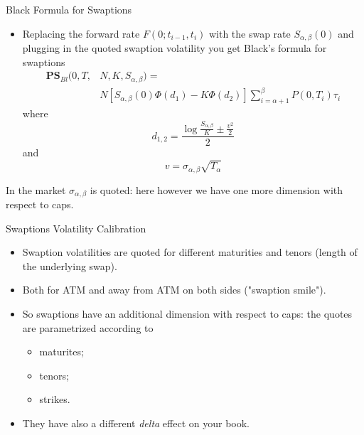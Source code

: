 \documentclass{beamer}
\begin{document}
\begin{frame}{Black Formula for Swaptions}
\begin{itemize}
	\item Replacing the forward rate $F(0;t_{i-1},t_i)$ with the swap rate $S_{\alpha,\beta}(0)$ and plugging in the quoted swaption volatility you get Black's formula for swaptions
	\begin{equation}
		\begin{aligned}
			\textbf{PS}_{Bl}(0,T,&N,K,S_{\alpha,\beta})=\\
			&N\left[S_{\alpha,\beta}(0)\Phi(d_1)-K\Phi(d_2)\right]\sum_{i=\alpha+1}^\beta P(0,T_i)\tau_i
		\end{aligned}	
	\end{equation}
	where
	\begin{equation*}
		d_{1,2} = \frac{\log{\frac{S_{\alpha,\beta}}{K}} \pm \frac{v^2}{2}}{2}
	\end{equation*}
	and
	\begin{equation*}
		v = \sigma_{\alpha,\beta}\sqrt{T_\alpha}
	\end{equation*}
\end{itemize}
In the market $\sigma_{\alpha,\beta}$ is quoted: here however we have one more dimension with respect to caps.
\end{frame}

\begin{frame}{Swaptions Volatility Calibration}
\begin{itemize}
	\item Swaption volatilities are quoted for different maturities and tenors (length of the underlying swap).
	\item Both for ATM and away from ATM on both sides ("swaption smile").
	\item So swaptions have an additional dimension with respect to caps: the quotes are parametrized according to 
	\begin{itemize}
		\item maturites;
		\item tenors;
		\item strikes.
	\end{itemize}
	\item They have also a different \emph{delta} effect on your book.
\end{itemize}
\end{frame}
\end{document}
